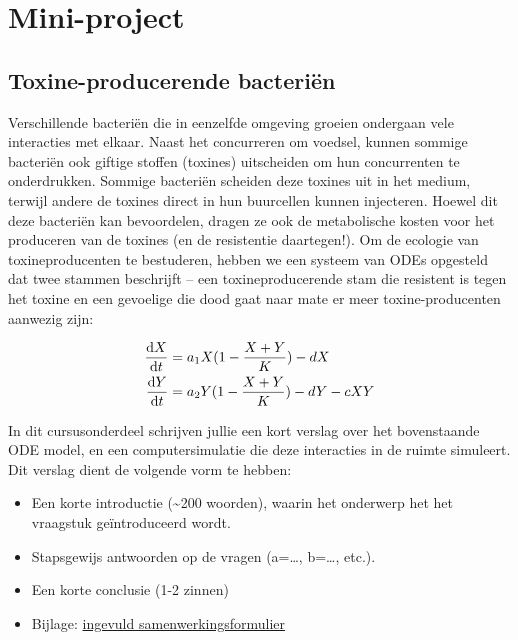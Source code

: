 \documentclass[
  letterpaper,
  DIV=11,
  numbers=noendperiod]{scrartcl}
\providecommand{\tightlist}{%
  \setlength{\itemsep}{0pt}\setlength{\parskip}{0pt}}
\begin{document}
\newcommand{\dd}{\mathrm{d}}

\providecommand{\HO}{H\ped{0}}
\providecommand{\HA}{H\ped{A}}
\providecommand{\df}{\mathrm{df}}

\section*{Mini-project}\label{sec-evolutie}

\subsection{Toxine-producerende
bacteriën}\label{toxine-producerende-bacteriuxebn}

Verschillende bacteriën die in eenzelfde omgeving groeien ondergaan vele
interacties met elkaar. Naast het concurreren om voedsel, kunnen sommige
bacteriën ook giftige stoffen (toxines) uitscheiden om hun concurrenten
te onderdrukken. Sommige bacteriën scheiden deze toxines uit in het
medium, terwijl andere de toxines direct in hun buurcellen kunnen
injecteren. Hoewel dit deze bacteriën kan bevoordelen, dragen ze ook de
metabolische kosten voor het produceren van de toxines (en de
resistentie daartegen!). Om de ecologie van toxineproducenten te
bestuderen, hebben we een systeem van ODEs opgesteld dat twee stammen
beschrijft -- een toxineproducerende stam die resistent is tegen het
toxine en een gevoelige die dood gaat naar mate er meer
toxine-producenten aanwezig zijn:

\begin{align}

\mathchoice{\frac{\mathrm{d}X}
{\mathrm{d}t}}{\mathrm{d}X/\mathrm{d}t}
{\mathrm{d}X/\mathrm{d}t}
{\mathrm{d}X/\mathrm{d}t}
 &= a_{1}X(1-\frac{X+Y}{K}) - dX \\

\mathchoice{\frac{\mathrm{d}Y}
{\mathrm{d}t}}{\mathrm{d}Y/\mathrm{d}t}
{\mathrm{d}Y/\mathrm{d}t}
{\mathrm{d}Y/\mathrm{d}t}
 &= a_{2}Y(1-\frac{X+Y}{K}) - dY - cXY
\end{align}

In dit cursusonderdeel schrijven jullie een kort verslag over het
bovenstaande ODE model, en een computersimulatie die deze interacties in
de ruimte simuleert. Dit verslag dient de volgende vorm te hebben:

\begin{itemize}
\tightlist
\item
  Een korte introductie (\textasciitilde200 woorden), waarin het
  onderwerp het het vraagstuk geïntroduceerd wordt.\\
\item
  Stapsgewijs antwoorden op de vragen (a=\ldots, b=\ldots, etc.).
\item
  Een korte conclusie (1-2 zinnen)
\item
  Bijlage:
  \href{../Appendices/samenwerkings_startformulier.docx}{ingevuld
  samenwerkingsformulier}
\end{itemize}
\end{document}
